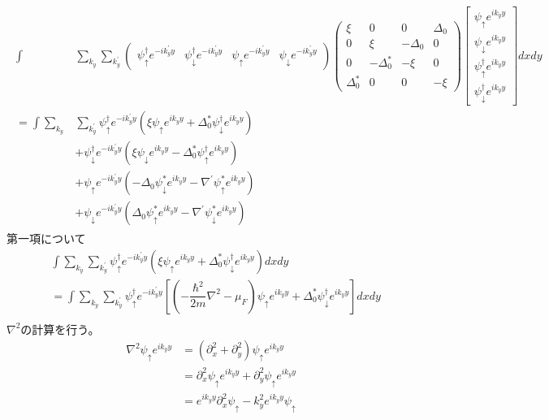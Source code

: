 \documentclass{jarticle}
\begin{document}
	\begin{align}
	\begin{split}
	\int&\displaystyle\sum_{k_y}\sum_{k_y^{'}}\begin{pmatrix}
	\psi_{\uparrow}^{\dagger}e^{-ik_y^{'}y} & \psi_{\downarrow}^{\dagger}e^{-ik_y^{'}y} & \psi_{\uparrow}e^{-ik_y^{'}y} & \psi_{\downarrow}e^{-ik_y^{'}y}
	\end{pmatrix}
	\begin{pmatrix}
	\xi & 0 & 0 & \Delta_0 \\ 
	0 & \xi & -\Delta_0 & 0 \\ 
	0 & -\Delta^{*}_0 & -\xi & 0 \\ 
	\Delta^{*}_0 & 0 & 0 & -\xi
	\end{pmatrix}
	\displaystyle\begin{bmatrix}
	\psi_{\uparrow}e^{ik_yy} \\
	\psi_{\downarrow}e^{ik_yy} \\
	\psi_{\uparrow}^{\dagger} e^{ik_yy}\\
	\psi_{\downarrow}^{\dagger}e^{ik_yy}
	\end{bmatrix}dxdy
	\\=\int\displaystyle\sum_{k_y}&\sum_{k_y^{'}}\psi_{\uparrow}^{\dagger}e^{-ik_y^{'}y}(\xi\psi_{\uparrow}e^{ik_yy}+\Delta^{*}_0\psi_{\downarrow}^{\dagger}e^{ik_yy})\\&
	+\psi_{\downarrow}^{\dagger}e^{-ik_y^{'}y}(\xi\psi_{\downarrow}e^{ik_yy}-\Delta^{*}_0\psi_{\uparrow}^{\dagger}e^{ik_yy})\\&
	+\psi_{\uparrow}e^{-ik_y^{'}y}(-\Delta_0\psi_{\downarrow}^{*}e^{ik_yy}-\nabla^{'}\psi_{\uparrow}^{*}e^{ik_yy})\\&
	+\psi_{\downarrow}e^{-ik_y^{'}y}(\Delta_0\psi_{\uparrow}^{*}e^{ik_yy}-\nabla^{'}\psi_{\downarrow}^{*}e^{ik_yy})
	\end{split}	                                                          
	\end{align}
	第一項について
	\begin{align}
	&\int\displaystyle\sum_{k_y}\sum_{k_y^{'}}\psi_{\uparrow}^{\dagger}e^{-ik_y^{'}y}(\xi\psi_{\uparrow}e^{ik_yy}+\Delta^{*}_0\psi_{\downarrow}^{\dagger}e^{ik_yy})dxdy\\
	&=\int\displaystyle\sum_{k_y}\sum_{k_y^{'}}\psi_{\uparrow}^{\dagger}e^{-ik_y^{'}y}[(-\dfrac{\hbar^2}{2m}\nabla^2-\mu_F)\psi_{\uparrow}e^{ik_yy}+\Delta^{*}_0\psi_{\downarrow}^{\dagger}e^{ik_yy}]dxdy\\
	\end{align}
	$\nabla^2$の計算を行う。
	\begin{align}
	\nabla^{2}\psi_{\uparrow}e^{ik_yy}&=(\partial_x^2+\partial_y^2)\psi_{\uparrow}e^{ik_yy}\\
	&=\partial_x^2\psi_{\uparrow}e^{ik_yy}+\partial_y^2\psi_{\uparrow}e^{ik_yy}\\
	&=e^{ik_yy}\partial_x^2\psi_{\uparrow}-k^{2}_ye^{ik_yy}\psi_{\uparrow}
	\end{align}
\end{document}

